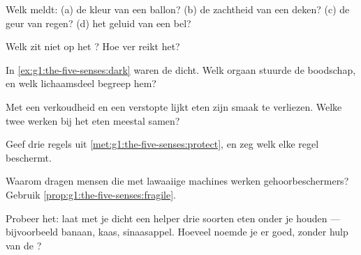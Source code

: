 \begin{exercise}[$\star$]\label{exo:g1:the-five-senses:2}
Welk  meldt: (a) de kleur van een ballon? (b) de zachtheid
van een deken? (c) de geur van regen? (d) het geluid van een bel?
\end{exercise}

\begin{exercise}[$\star$]\label{exo:g1:the-five-senses:3}
Welk  zit niet op het ? Hoe ver reikt het?
\end{exercise}

\begin{exercise}[$\star$]\label{exo:g1:the-five-senses:4}
In \cref{ex:g1:the-five-senses:dark} waren de  dicht. Welk orgaan
stuurde de boodschap, en welk lichaamsdeel begreep hem?
\end{exercise}

\begin{exercise}[$\star$]\label{exo:g1:the-five-senses:5}
Met een verkoudheid en een verstopte  lijkt eten zijn smaak te
verliezen. Welke twee  werken bij het eten meestal samen?
\end{exercise}

\begin{exercise}[$\star$]\label{exo:g1:the-five-senses:6}
Geef drie regels uit \cref{met:g1:the-five-senses:protect}, en zeg welk
 elke regel beschermt.
\end{exercise}

\begin{exercise}[$\star$]\label{exo:g1:the-five-senses:7}
Waarom dragen mensen die met lawaaiige machines werken
gehoorbeschermers? Gebruik \cref{prop:g1:the-five-senses:fragile}.
\end{exercise}

\begin{exercise}[$\star$]\label{exo:g1:the-five-senses:8}
Probeer het: laat met je  dicht een helper drie soorten eten onder
je  houden --- bijvoorbeeld banaan, kaas, sinaasappel. Hoeveel
noemde je  er goed, zonder hulp van de ?
\end{exercise}

